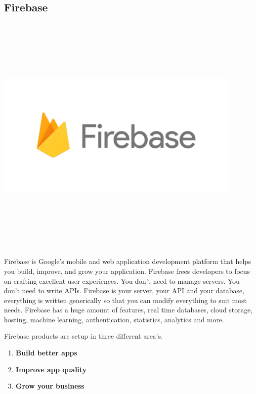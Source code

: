 \subsection{Firebase}
\par
\medskip
\begin{center}
    \includegraphics[width=12cm,height=12cm,keepaspectratio]{Images/firebase.png}
\end{center}

Firebase is Google's mobile and web application development platform that helps you build, improve, and grow your application. Firebase frees developers to focus on crafting excellent user experiences. You don't need to manage servers. You don't need to write APIs. Firebase is your server, your API and your database, everything is written generically so that you can modify everything to suit most needs. Firebase has a huge amount of features, real time databases, cloud storage, hosting, machine learning, authentication, statistics, analytics and more.\newline

Firebase products are setup in three different area's.
\begin{enumerate}
  \item \textbf{Build better apps}
  \item \textbf{Improve app quality}
  \item \textbf{Grow your business}
\end{enumerate}

